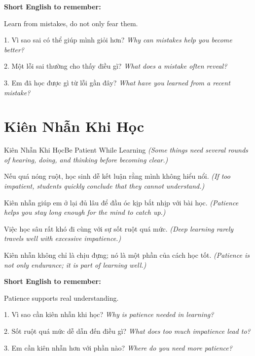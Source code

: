 \begin{ghinhoanh}
\textbf{Short English to remember:}

Learn from mistakes, do not only fear them.

\end{ghinhoanh}

\begin{tuhocnhanh}
1. Vì sao sai có thể giúp mình giỏi hơn? \textit{Why can mistakes help you become better?}

2. Một lỗi sai thường cho thấy điều gì? \textit{What does a mistake often reveal?}

3. Em đã học được gì từ lỗi gần đây? \textit{What have you learned from a recent mistake?}
\end{tuhocnhanh}
\ngancach

\section{Kiên Nhẫn Khi Học}
\begin{truyen}{Kiên Nhẫn Khi Học}{Be Patient While Learning}
\textit{(Some things need several rounds of hearing, doing, and thinking before becoming clear.)}

Nếu quá nóng ruột, học sinh dễ kết luận rằng mình không hiểu nổi.
\textit{(If too impatient, students quickly conclude that they cannot understand.)}

Kiên nhẫn giúp em ở lại đủ lâu để đầu óc kịp bắt nhịp với bài học.
\textit{(Patience helps you stay long enough for the mind to catch up.)}

Việc học sâu rất khó đi cùng với sự sốt ruột quá mức.
\textit{(Deep learning rarely travels well with excessive impatience.)}
\end{truyen}

\begin{baihoc}
Kiên nhẫn không chỉ là chịu đựng; nó là một phần của cách học tốt.
\textit{(Patience is not only endurance; it is part of learning well.)}
\end{baihoc}

\begin{ghinhoanh}
\textbf{Short English to remember:}

Patience supports real understanding.

\end{ghinhoanh}

\begin{tuhocnhanh}
1. Vì sao cần kiên nhẫn khi học? \textit{Why is patience needed in learning?}

2. Sốt ruột quá mức dễ dẫn đến điều gì? \textit{What does too much impatience lead to?}

3. Em cần kiên nhẫn hơn với phần nào? \textit{Where do you need more patience?}
\end{tuhocnhanh}
\ngancach

